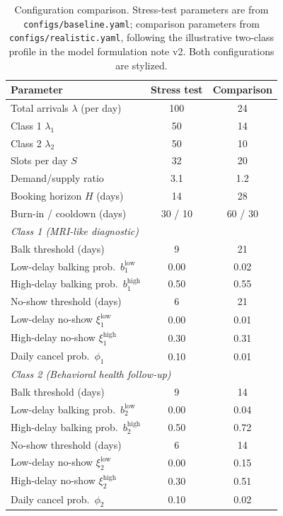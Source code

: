 \documentclass[11pt]{article}
\begin{document}
\begin{table}[h]
\centering
\renewcommand{\arraystretch}{1.18}
\small
\begin{tabular}{lcc}
\toprule
Parameter & Stress test & Comparison \\
\midrule
Total arrivals $\lambda$ (per day) & 100 & 24 \\
\quad Class 1 $\lambda_1$ & 50 & 14 \\
\quad Class 2 $\lambda_2$ & 50 & 10 \\
Slots per day $S$ & 32 & 20 \\
Demand/supply ratio & 3.1 & 1.2 \\
Booking horizon $H$ (days) & 14 & 28 \\
Burn-in / cooldown (days) & 30 / 10 & 60 / 30 \\
\midrule
\multicolumn{3}{l}{\textit{Class 1 (MRI-like diagnostic)}} \\
\quad Balk threshold (days) & 9 & 21 \\
\quad Low-delay balking prob.\ $b^{\text{low}}_1$ & 0.00 & 0.02 \\
\quad High-delay balking prob.\ $b^{\text{high}}_1$ & 0.50 & 0.55 \\
\quad No-show threshold (days) & 6 & 21 \\
\quad Low-delay no-show $\xi^{\text{low}}_1$ & 0.00 & 0.01 \\
\quad High-delay no-show $\xi^{\text{high}}_1$ & 0.30 & 0.31 \\
\quad Daily cancel prob.\ $\phi_1$ & 0.10 & 0.01 \\
\midrule
\multicolumn{3}{l}{\textit{Class 2 (Behavioral health follow-up)}} \\
\quad Balk threshold (days) & 9 & 14 \\
\quad Low-delay balking prob.\ $b^{\text{low}}_2$ & 0.00 & 0.04 \\
\quad High-delay balking prob.\ $b^{\text{high}}_2$ & 0.50 & 0.72 \\
\quad No-show threshold (days) & 6 & 14 \\
\quad Low-delay no-show $\xi^{\text{low}}_2$ & 0.00 & 0.15 \\
\quad High-delay no-show $\xi^{\text{high}}_2$ & 0.30 & 0.51 \\
\quad Daily cancel prob.\ $\phi_2$ & 0.10 & 0.02 \\
\bottomrule
\end{tabular}
\caption{Configuration comparison. Stress-test parameters are from
\texttt{configs/baseline.yaml}; comparison parameters from
\texttt{configs/realistic.yaml}, following the illustrative two-class profile
in the model formulation note v2. Both configurations are stylized.}
\label{tab:params}
\end{table}
\end{document}
